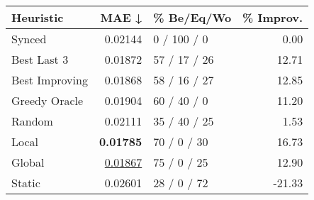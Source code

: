 \begin{tabular}{lrlr}
\toprule
\textbf{Heuristic} & \textbf{MAE ↓} & \textbf{\% Be/Eq/Wo} & \textbf{\% Improv.} \\
\midrule
            Synced &        0.02144 &          0 / 100 / 0 &                0.00 \\
\midrule
       Best Last 3 &        0.01872 &         57 / 17 / 26 &               12.71 \\
    Best Improving &        0.01868 &         58 / 16 / 27 &               12.85 \\
\addlinespace
     Greedy Oracle &        0.01904 &          60 / 40 / 0 &               11.20 \\
            Random &        0.02111 &         35 / 40 / 25 &                1.53 \\
\midrule
             Local &        \textbf{0.01785} &          70 / 0 / 30 &               16.73 \\
            Global &        \underline{0.01867} &          75 / 0 / 25 &               12.90 \\
\midrule
            Static &        0.02601 &          28 / 0 / 72 &              -21.33 \\
\bottomrule
\end{tabular}

\label{tab:non_lr01_le1_bs2_Summary}
